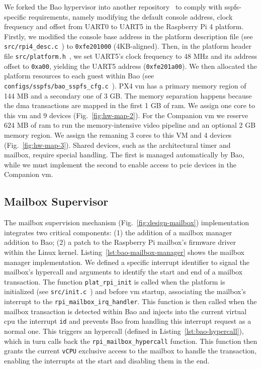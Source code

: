 We forked the Bao hypervisor into another repository~\cite{baoRepo-mine} to comply with
\gls{sspfs}-specific requirements, namely modifying the default console address,
clock frequency and offset from UART0 to UART5 in the Raspberry Pi 4 platform.
Firstly, we modified the console base address in the platform description file
(see \lstinline{src/rpi4_desc.c}~\cite{thesis-sw-github}) to
\lstinline{0xfe201000} (4KB-aligned). Then, in the platform header file \lstinline{src/platform.h}~\cite{thesis-sw-github}, we set UART5's clock frequency to 48
MHz and its address offset to \lstinline{0xa00}, yielding the UART5 address
(\lstinline{0xfe201a00}).
We then allocated the platform resources to each guest within Bao (see
\lstinline{configs/sspfs/bao_sspfs_cfg.c}~\cite{thesis-sw-github}). PX4 \gls{vm}
has a primary memory region of 144 MB and a secondary one of 3 GB. The memory
separation happens because the \gls{dma} transactions are mapped in the first 1
GB of \gls{ram}. We assign one core to this \gls{vm} and 9 devices
(Fig.~\ref{fig:hw-map-2}). For the Companion \gls{vm} we reserve 624 MB of \gls{ram}
to run the memory-intensive video pipeline and an optional 2 GB memory
region. We assign the remaning 3 cores to this VM and 4 devices
(Fig.~\ref{fig:hw-map-3}).
Shared devices, such as the architectural timer and mailbox, require special
handling. The first is managed automatically by Bao, while we must implement the
second to enable access to \gls{pcie} devices in the Companion \gls{vm}.

\subsection{Mailbox Supervisor}
The mailbox supervision mechanism (Fig.~\ref{fig:design-mailbox}) implementation
integrates two critical components: (1) the addition of a mailbox manager
addition to Bao; (2) a patch to the Raspberry Pi mailbox's firmware driver
within the Linux kernel.
Listing~\ref{lst:bao-mailbox-manager} shows the mailbox manager implementation.
We defined a specific interrupt identifier to signal the mailbox's hypercall
and arguments to identify the start and end of a mailbox transaction. The
function \lstinline{plat_rpi_init} is called when the platform is initialized
(see \lstinline{src/init.c}~\cite{thesis-sw-github}) and before \gls{vm}
startup, associating the mailbox's interrupt to the
\lstinline{rpi_mailbox_irq_handler}. This function is then called when the
mailbox transaction is detected within Bao and injects into the current virtual
\gls{cpu} the interrupt \lstinline{id} and prevents Bao from handling this
interrupt request as a normal one. This triggers an hypercall (defined in
Listing~\ref{lst:bao-hypercall}), which in turn calls back the \lstinline{rpi_mailbox_hypercall}
function. This function then grants the current \lstinline{vCPU} exclusive access to the mailbox to handle the transaction, enabling the interrupts at the
start and disabling them in the end.

